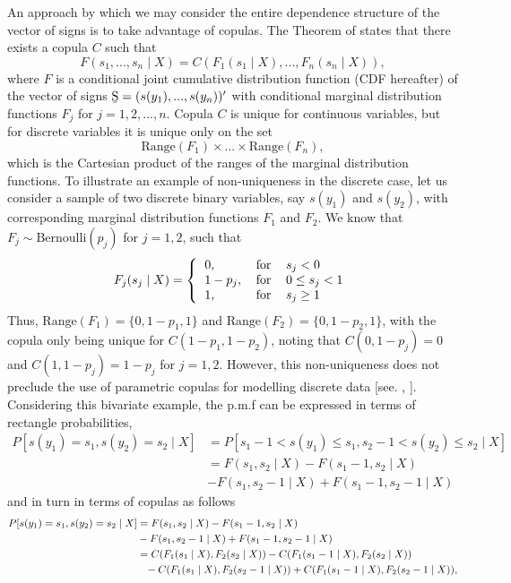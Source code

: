 \documentclass[harvard,11pt]{article}
\begin{document}
An approach by which we may consider the entire dependence structure of the vector of signs is to take advantage of copulas. The Theorem of  \citet{sklar1959fonctions} states that there exists a copula $C$ such that
\begin{equation}
F(s_1,...,s_n\mid X)=C(F_1(s_1\mid X),...,F_n(s_n\mid X)),
\end{equation}
where $F$ is a conditional joint cumulative distribution function (CDF hereafter) of the vector of signs $\text{\b{S}}=(s(y_1),...,s(y_n))'$ with conditional marginal distribution functions $F_j$ for $j=1,2,...,n$. Copula $C$ is unique for continuous variables, but for discrete variables it is unique only on the set
\[
\text{Range}(F_1)\times...\times\text{Range}(F_n),
\]
which is the Cartesian product of the ranges of the marginal distribution functions. To illustrate an example of non-uniqueness in the discrete case, let us consider a sample of two discrete binary variables, say $s(y_1)$ and $s(y_2)$, with corresponding marginal distribution functions $F_1$ and $F_2$. We know that $F_j\sim\text{Bernoulli}(p_j)$ for $j=1,2$, such that
\begin{equation}\label{eq: BernoulliCDF}
F_j(s_j\mid X)=\left\{ 
\begin{tabular}{lll}
$0,$ &$\text{for}$& $s_j< 0$ \\ 
$1-p_j,$ &$\text{for}$ &$0\leq s_j< 1$ \\
$1,$& $\text{for}$& $s_j\geq 1$
\end{tabular}%
\right.
\end{equation} 
Thus, $\text{Range}(F_1)=\{0,1-p_1,1\}$ and $\text{Range}(F_2)=\{0,1-p_2,1\}$, with the copula only being unique for $C(1-p_1,1-p_2)$, noting that $C(0,1-p_j)=0$ and $C(1,1-p_j)=1-p_j$ for $j=1,2$. However, this non-uniqueness does not preclude the use of parametric copulas for modelling discrete data [see. \citet{joe1997multivariate}, \citet{song2009joint}]. Considering this bivariate example, the p.m.f can be expressed in terms of rectangle probabilities, 
\begingroup
\allowdisplaybreaks
\begin{align*}
P[s(y_1)=s_1,s(y_2)=s_2\mid X]&=P[s_1-1<s(y_1)\leq s_1,s_2-1<s(y_2)\leq s_2\mid X]\\
&=F(s_1,s_2\mid X)-F(s_1-1,s_2\mid X)\\
&-F(s_1,s_2-1\mid X)+F(s_1-1,s_2-1\mid X)
\end{align*}
\endgroup
and in turn in terms of copulas as follows
\begingroup
\allowdisplaybreaks
\begin{align*}
P[s(y_1)=s_1,s(y_2)=s_2\mid X]&=F(s_1,s_2\mid X)-F(s_1-1,s_2\mid X)\\
&-F(s_1,s_2-1\mid X)+F(s_1-1,s_2-1\mid X)\\
&=C(F_1(s_1\mid X),F_2(s_2\mid X))-C(F_1(s_1-1\mid X),F_2(s_2\mid X))\\
&\textcolor{white}{=}-C(F_1(s_1\mid X),F_2(s_2-1\mid X))+C(F_1(s_1-1\mid X),F_2(s_2-1\mid X)),
\end{align*}
\end{document}
